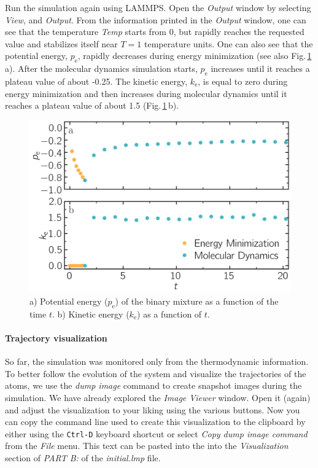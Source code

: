 \documentclass[9pt,tutorial]{livecoms}
\begin{document}
Run the simulation again using LAMMPS. Open the \textit{Output} window
by selecting \textit{View}, and \textit{Output}. From the information
printed in the \textit{Output} window, one can see that the temperature
\textit{Temp} starts from 0, but rapidly reaches the requested value and
stabilizes itself near $T=1$ temperature units.  One can also see that
the potential energy, $p_\text{e}$, rapidly decreases during energy
minimization (see also Fig.\,\ref{fig:evolution-energy}\,a). After
the molecular dynamics simulation starts, $p_\text{e}$ increases until
it reaches a plateau value of about -0.25. The kinetic energy,
$k_\text{e}$, is equal to zero during energy minimization and then
increases during molecular dynamics until it reaches a plateau value of
about 1.5 (Fig.\,\ref{fig:evolution-energy}\,b).

\begin{figure}
\centering
\includegraphics[width=\linewidth]{LJ-energy}
\caption{a) Potential energy ($p_\text{e}$) of the binary mixture as a function
of the time $t$. b) Kinetic energy ($k_\text{e}$) as a function of $t$.}
\label{fig:evolution-energy}
\end{figure}

\paragraph{Trajectory visualization}

So far, the simulation was monitored only from the thermodynamic
information.  To better follow the evolution of the system and visualize
the trajectories of the atoms, we use the \textit{dump image} command to
create snapshot images during the simulation.  We have already explored
the \textit{Image Viewer} window.  Open it (again) and adjust the
visualization to your liking using the various buttons.  Now you can
copy the command line used to create this visualization to the clipboard
by either using the \texttt{Ctrl-D} keyboard shortcut or select
\textit{Copy dump image command} from the \textit{File} menu.  This text
can be pasted into the into the \textit{Visualization} section of
\textit{PART B:} of the \textit{initial.lmp} file.
\end{document}
